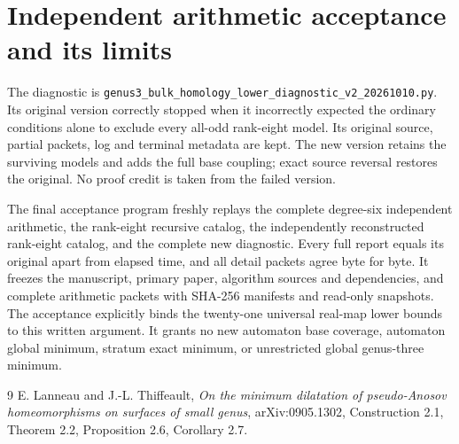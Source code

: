\documentclass[11pt]{article}
\begin{document}
\section{Independent arithmetic acceptance and its limits}
The diagnostic is \texttt{genus3\_bulk\_homology\_lower\_diagnostic\_v2\_20261010.py}.
Its original version correctly stopped when it incorrectly expected the
ordinary conditions alone to exclude every all-odd rank-eight model.
Its original source, partial packets, log and terminal metadata are kept.
The new version retains the surviving models and adds the full base
coupling; exact source reversal restores the original. No proof credit is
taken from the failed version.

The final acceptance program freshly replays the complete degree-six
independent arithmetic, the rank-eight recursive catalog, the independently
reconstructed rank-eight catalog, and the complete new diagnostic. Every
full report equals its original apart from elapsed time, and all detail
packets agree byte for byte. It freezes the manuscript, primary paper,
algorithm sources and dependencies, and complete arithmetic packets with
SHA-256 manifests and read-only snapshots. The acceptance explicitly binds
the twenty-one universal real-map lower bounds to this written argument.
It grants no new automaton base coverage, automaton global minimum,
stratum exact minimum, or unrestricted global genus-three minimum.

\begin{thebibliography}{9}
 E. Lanneau and J.-L. Thiffeault,
\emph{On the minimum dilatation of pseudo-Anosov homeomorphisms on surfaces
of small genus}, arXiv:0905.1302, Construction 2.1, Theorem 2.2,
Proposition 2.6, Corollary 2.7.
\end{thebibliography}
\end{document}
